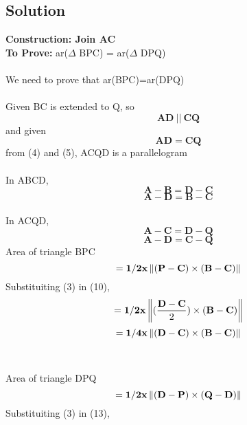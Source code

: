 \documentclass[journal,12pt,twocolumn]{IEEEtran}
\let\vec\mathbf
\let\vec\mathbf
\begin{document}
\begin{tableofcontents}
\section{Solution}
\justify
\textbf{Construction: Join AC}\\
\justify
\textbf{To Prove:}
ar($\Delta$ BPC) = ar($\Delta$ DPQ)\\
\\
We need to prove that ar(BPC)=ar(DPQ)\\
\\
Given BC is extended to Q, so \begin{equation}
\vec{AD} \: || \: \vec{CQ} 
\end{equation}
and given \begin{equation}
\vec{AD}=\vec{CQ}
\end{equation}
from (4) and (5), ACQD is a parallelogram\\
\\
In ABCD,
\begin{equation}
\vec{A-B}=\vec{D-C}
\end{equation}
\begin{equation}
\vec{A-D}=\vec{B-C}
\end{equation}
\\
In ACQD,
\begin{equation}
\vec{A-C}=\vec{D-Q}
\end{equation}
\begin{equation}
\vec{A-D}=\vec{C-Q}
\end{equation}
Area of triangle BPC \\
\begin{equation}
=\vec{1/2} \vec{x} \norm{(\vec{P} - \vec{C}) \times (\vec{B} - \vec{C})}
\end{equation}
Substituiting (3) in (10),\\
\begin{equation}
=\vec{1/2} \vec{x} \norm{(\frac{\vec{D}-\vec{C}}{2}) \times (\vec{B} - \vec{C})}
\end{equation}
\begin{equation}
=\vec{1/4} \vec{x} \norm{(\vec{D-C}) \times (\vec{B-C})}
\end{equation}\\
\\
Area of triangle DPQ\\
\begin{equation}
=\vec{1/2} \vec{x} \norm{(\vec{D} - \vec{P}) \times (\vec{Q} - \vec{D})}
\end{equation}
Substituiting (3) in (13),\\

\end{tableofcontents}
\end{document}
